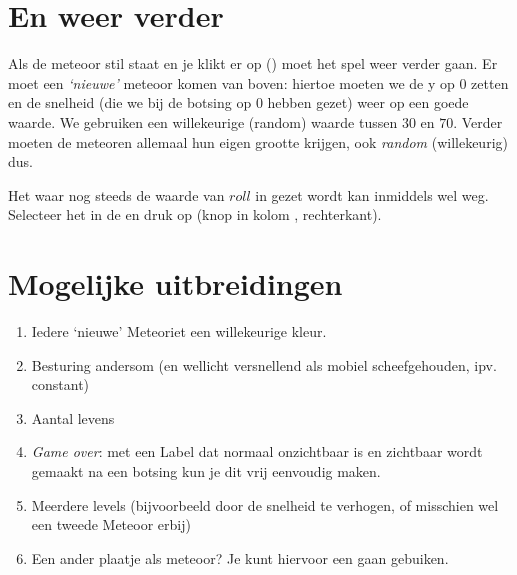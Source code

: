 



\section{En weer verder}
Als \runOpTelefoon{}de meteoor stil staat en je klikt er op () moet het spel weer verder gaan. Er moet een \emph{`nieuwe'} meteoor komen van boven: hiertoe moeten we de y op $0$ zetten en de snelheid (die we bij de botsing op $0$  hebben gezet) weer op een goede waarde. We gebruiken een willekeurige (random) waarde tussen $30$ en $70$. Verder moeten de meteoren allemaal hun eigen grootte krijgen, ook \emph{random} (willekeurig) dus.


\runOpTelefoon{}
Het  waar nog steeds de waarde van $roll$ in gezet wordt kan inmiddels wel weg. Selecteer het in de  en druk op  (knop in kolom , rechterkant). 




\section{Mogelijke uitbreidingen}

\begin{enumerate}
\item	Iedere `nieuwe' Meteoriet een willekeurige kleur. 
\item	Besturing andersom (en wellicht versnellend als mobiel scheefgehouden, ipv. constant)
\item	Aantal levens
\item	\emph{Game over}: met een Label dat normaal onzichtbaar is en zichtbaar wordt gemaakt na een botsing kun je dit vrij eenvoudig maken. 
\item	Meerdere levels (bijvoorbeeld door de snelheid te verhogen, of misschien wel een tweede Meteoor erbij)
\item	Een ander plaatje als meteoor? Je kunt hiervoor een  gaan gebuiken. 
\end{enumerate}


